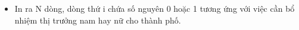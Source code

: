 \begin{itemize}
	\item In ra N dòng, dòng thứ i chứa số nguyên 0 hoặc 1 tương ứng với việc cần bổ nhiệm thị trưởng nam hay nữ cho thành phố.
\end{itemize}

\